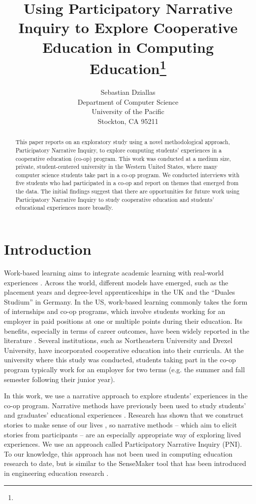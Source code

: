 \documentclass{article}
\title{Using Participatory Narrative Inquiry to Explore Cooperative Education in Computing Education\footnote{\protect}
}
\author{
  Sebastian Dziallas\\
  Department of Computer Science\\
  University of the Pacific\\
  Stockton, CA 95211\\
  \email{sdziallas@pacific.edu}
}
\begin{document}
\maketitle

\thispagestyle{empty}
\pagestyle{empty}

\begin{abstract}
This paper reports on an exploratory study using a novel methodological approach, Participatory Narrative Inquiry, to explore computing students’ experiences in a cooperative education (co-op) program. This work was conducted at a medium size, private, student-centered university in the Western United States, where many computer science students take part in a co-op program. We conducted interviews with five students who had participated in a co-op and report on themes that emerged from the data. The initial findings suggest that there are opportunities for future work using Participatory Narrative Inquiry to study cooperative education and students’ educational experiences more broadly.

\end{abstract}

\section{Introduction}
Work-based learning aims to integrate academic learning with real-world experiences \cite{fincherPorousClassroomProfessional2013a, maguireBackFutureShaping2019}. Across the world, different models have emerged, such as the placement years and degree-level apprenticeships in the UK and the “Duales Studium” in Germany. In the US, work-based learning commonly takes the form of internships and co-op programs, which involve students working for an employer in paid positions at one or multiple points during their education. Its benefits, especially in terms of career outcomes, have been widely reported in the literature \cite{ramirezAcademicOutcomesCooperative2015}. Several institutions, such as Northeastern University and Drexel University, have incorporated cooperative education into their curricula. At the university where this study was conducted, students taking part in the co-op program typically work for an employer for two terms (e.g. the summer and fall semester following their junior year).

In this work, we use a narrative approach to explore students’ experiences in the co-op program. Narrative methods have previously been used to study students’ and graduates’ educational experiences \cite{dziallasAspectsGraduatenessComputing2016, holmegaardWhereEngineeringApplied2016}. Research has shown that we construct stories to make sense of our lives \cite{mcadamsWhatWeKnow1995}, so narrative methods – which aim to elicit stories from participants – are an especially appropriate way of exploring lived experiences. We use an approach called Participatory Narrative Inquiry (PNI). To our knowledge, this approach has not been used in computing education research to date, but is similar to the SenseMaker tool that has been introduced in engineering education research \cite{sochackaUsingSenseMakerExamine2020}.
\end{document}
